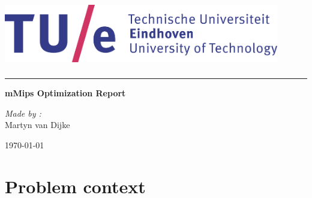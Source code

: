 \documentclass[10pt]{article}
\begin{document}
\begin{titlepage}
    \color[rgb]{.1,.1,1}
    \hspace{5mm}
    \includegraphics[width=12cm,height=3cm]{tue.png}

    \bigskip

    \hspace{40mm}
    \begin{minipage}{10mm}
        \color[rgb]{.0,.0,0.0}
        \rule{1pt}{200mm}
    \end{minipage}
    \begin{minipage}{133mm}
        \vspace{20mm}
        \color{black}
        \Huge{\bfseries {mMips Optimization Report}}

        \vspace{40mm}

        \textit{Made by :}\\
        Martyn van Dijke


        \vspace{20mm}

        \today
        \hspace{30mm} %
        \color[rgb]{.4,.4,1} %
    \end{minipage}
\end{titlepage}

\restoregeometry
\clearpage



\tableofcontents

\clearpage

\pagestyle{fancy}
\lhead{ \nouppercase \leftmark }
\chead{  }
\rhead{    }
\renewcommand{\headrulewidth}{0.4pt}
\lfoot{}
\cfoot{}

\section{Problem context}


\end{document}

